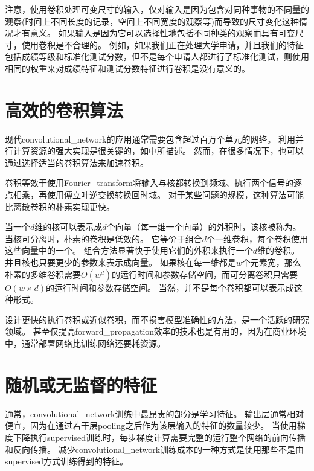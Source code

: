 注意，使用卷积处理可变尺寸的输入，仅对输入是因为包含对同种事物的不同量的观察(时间上不同长度的记录，空间上不同宽度的观察等)而导致的尺寸变化这种情况才有意义。
如果输入是因为它可以选择性地包括不同种类的观察而具有可变尺寸，使用卷积是不合理的。
例如，如果我们正在处理大学申请，并且我们的特征包括成绩等级和标准化测试分数，但不是每个申请人都进行了标准化测试，则使用相同的权重来对成绩特征和测试分数特征进行卷积是没有意义的。

\section{高效的卷积算法}
\label{sec:efficient_convolution_algorithms}

现代\gls{convolutional_network}的应用通常需要包含超过百万个单元的网络。
利用并行计算资源的强大实现是很关键的，如中所描述。
然而，在很多情况下，也可以通过选择适当的卷积算法来加速卷积。
 
 
卷积等效于使用\gls{Fourier_transform}将输入与核都转换到频域、执行两个信号的逐点相乘，再使用傅立叶逆变换转换回时域。
对于某些问题的规模，这种算法可能比离散卷积的朴素实现更快。

当一个$d$维的核可以表示成$d$个向量（每一维一个向量）的外积时，该核被称为。
当核可分离时，朴素的卷积是低效的。
它等价于组合$d$个一维卷积，每个卷积使用这些向量中的一个。
组合方法显著快于使用它们的外积来执行一个$d$维的卷积。
并且核也只要更少的参数来表示成向量。
如果核在每一维都是$w$个元素宽，那么朴素的多维卷积需要$O(w^d)$的运行时间和参数存储空间，而可分离卷积只需要$O(w\times d)$的运行时间和参数存储空间。
当然，并不是每个卷积都可以表示成这种形式。

设计更快的执行卷积或近似卷积，而不损害模型准确性的方法，是一个活跃的研究领域。 
甚至仅提高\gls{forward_propagation}效率的技术也是有用的，因为在商业环境中，通常部署网络比训练网络还要耗资源。

\section{随机或无监督的特征}
\label{sec:random_or_unsupervised_features}

通常，\gls{convolutional_network}训练中最昂贵的部分是学习特征。 
输出层通常相对便宜，因为在通过若干层\gls{pooling}之后作为该层输入的特征的数量较少。
当使用梯度下降执行\gls{supervised}训练时，每步梯度计算需要完整的运行整个网络的前向传播和反向传播。
减少\gls{convolutional_network}训练成本的一种方式是使用那些不是由\gls{supervised}方式训练得到的特征。

